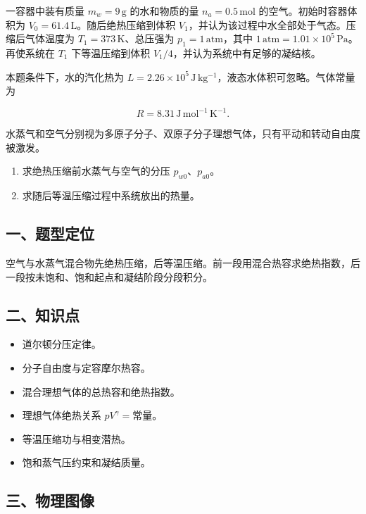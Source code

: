 \documentclass[12pt,a4paper,UTF8]{ctexart}
\newcommand{\tightlist}{\setlength{\itemsep}{0pt}\setlength{\parskip}{0pt}}
\begin{document}
一容器中装有质量 \(m_w=9\,\mathrm g\) 的水和物质的量
\(n_a=0.5\,\mathrm{mol}\) 的空气。初始时容器体积为
\(V_0=61.4\,\mathrm L\)。随后绝热压缩到体积
\(V_1\)，并认为该过程中水全部处于气态。压缩后气体温度为
\(T_1=373\,\mathrm K\)、总压强为 \(p_1=1\,\mathrm{atm}\)，其中
\(1\,\mathrm{atm}=1.01\times10^5\,\mathrm{Pa}\)。再使系统在 \(T_1\)
下等温压缩到体积 \(V_1/4\)，并认为系统中有足够的凝结核。

本题条件下，水的汽化热为
\(L=2.26\times10^5\,\mathrm{J\,kg^{-1}}\)，液态水体积可忽略。气体常量为

\[R=8.31\,\mathrm{J\,mol^{-1}\,K^{-1}}.\]

水蒸气和空气分别视为多原子分子、双原子分子理想气体，只有平动和转动自由度被激发。

\begin{enumerate}
\def\labelenumi{\arabic{enumi}.}
\tightlist
\item
  求绝热压缩前水蒸气与空气的分压 \(p_{w0}\)、\(p_{a0}\)。
\item
  求随后等温压缩过程中系统放出的热量。
\end{enumerate}

\subsection{一、题型定位}\label{ux4e00ux9898ux578bux5b9aux4f4d-5}

空气与水蒸气混合物先绝热压缩，后等温压缩。前一段用混合热容求绝热指数，后一段按未饱和、饱和起点和凝结阶段分段积分。

\subsection{二、知识点}\label{ux4e8cux77e5ux8bc6ux70b9-5}

\begin{itemize}
\tightlist
\item
  道尔顿分压定律。
\item
  分子自由度与定容摩尔热容。
\item
  混合理想气体的总热容和绝热指数。
\item
  理想气体绝热关系 \(pV^\gamma=\text{常量}\)。
\item
  等温压缩功与相变潜热。
\item
  饱和蒸气压约束和凝结质量。
\end{itemize}

\subsection{三、物理图像}\label{ux4e09ux7269ux7406ux56feux50cf-5}
\end{document}
